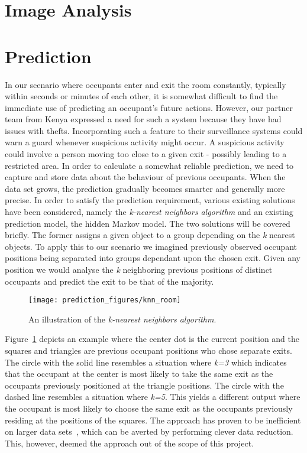 \section{Image Analysis}
\label{sec:analysis_img}


\section{Prediction}
\label{sec:analysis_pred}
In our scenario where occupants enter and exit the room constantly, typically within seconds or minutes of each other, it is somewhat difficult to find the immediate use of predicting an occupant's future actions. However, our partner team from Kenya expressed a need for such a system because they have had issues with thefts. Incorporating such a feature to their surveillance systems could warn a guard whenever suspicious activity might occur. A suspicious activity could involve a person moving too close to a given exit - possibly leading to a restricted area. In order to calculate a somewhat reliable prediction, we need to capture and store data about the behaviour of previous occupants. When the data set grows, the prediction gradually becomes smarter and generally more precise. In order to satisfy the prediction requirement, various existing solutions have been considered, namely the \emph{k-nearest neighbors algorithm} and an existing prediction model, the hidden Markov model. The two solutions will be covered briefly. The former assigns a given object to a group depending on the \emph{k} nearest objects. To apply this to our scenario we imagined previously observed occupant positions being separated into groups dependant upon the chosen exit. Given any position we would analyse the \emph{k} neighboring previous positions of distinct occupants and predict the exit to be that of the majority.
\begin{figure}
\centering
\texttt{[image: prediction\_figures/knn\_room]}
\caption{An illustration of the \emph{k-nearest neighbors algorithm}.}
\label{fig:knn}
\end{figure}
Figure~\ref{fig:knn} depicts an example where the center dot is the current position and the squares and triangles are previous occupant positions who chose separate exits. The circle with the solid line resembles a situation where \emph{k=3} which indicates that the occupant at the center is most likely to take the same exit as the occupants previously positioned at the triangle positions. The circle with the dashed line resembles a situation where \emph{k=5}. This yields a different output where the occupant is most likely to choose the same exit as the occupants previously residing at the positions of the squares. The approach has proven to be inefficient on larger data sets~\cite{bhatia}, which can be averted by performing clever data reduction. This, however, deemed the approach out of the scope of this project. \\
